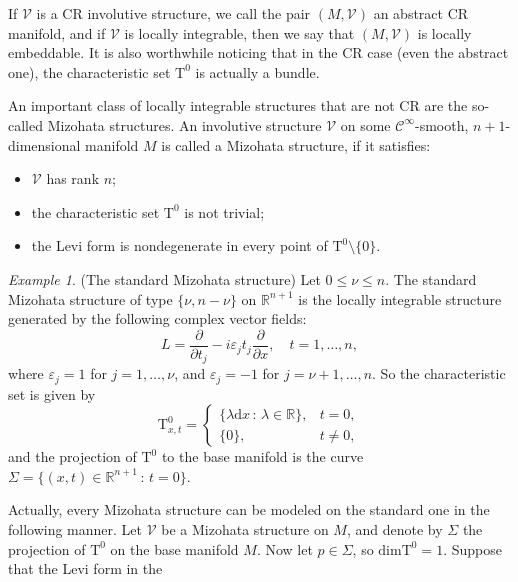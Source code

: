\documentclass[11pt]{amsart}
\renewcommand{\epsilon}{\varepsilon}
\theoremstyle{definition}
\theoremstyle{remark}
\newtheorem{exa}[defn]{Example}
\theoremstyle{plain}
\begin{document}
%
If $\mathcal{V}$ is a CR involutive structure, we call the pair
$(M, \mathcal{V})$ an abstract CR manifold, and if $\mathcal{V}$
is locally integrable, then we say that $(M, \mathcal{V})$ is
locally embeddable. It
is also worthwhile noticing that in the CR case (even the abstract
one), the characteristic set $\mathrm{T}^0$ is actually a bundle.

An important class of locally integrable structures that are not CR
are the so-called Mizohata structures. An involutive structure
$\mathcal{V}$ on some $\mathcal{C}^\infty$-smooth, $n+1$-dimensional
manifold $M$ is called a Mizohata structure, if it satisfies:
%
\begin{itemize}
\item $\mathcal{V}$ has rank $n$;
\item the characteristic set $\mathrm{T}^0$ is not trivial;
\item the Levi form is nondegenerate in every point of
  $\mathrm{T}^0\setminus \{0\}$.
\end{itemize}
%
\begin{exa}
  (The standard Mizohata structure) Let $0 \leq \nu \leq n$. The
  standard Mizohata structure of type $\{\nu, n- \nu\}$ on
  $\mathbb{R}^{n+1}$ is the locally integrable structure generated by
  the following complex vector fields:
%
  \begin{equation*}
    L = \frac{\partial}{\partial t_j} - i\epsilon_jt_j\frac{\partial}{\partial x}, \quad t = 1, \dots, n,
  \end{equation*}
%
  where $\epsilon_j = 1$ for $j = 1, \dots, \nu$, and
  $\epsilon_j = -1$ for $j = \nu + 1, \dots, n$. So the characteristic
  set is given by
%
  \begin{equation*}
    \mathrm{T}^0_{x,t} = 
    \begin{cases}
      \{\lambda \mathrm{d}x \, : \, \lambda \in \mathbb{R} \}, &  t = 0,\\
      \{0\}, & t \neq 0,
    \end{cases}
  \end{equation*}
%
  and the projection of $\mathrm{T}^0$ to the base manifold is the
  curve $\Sigma = \{(x,t) \in \mathbb{R}^{n+1} \, : \, t = 0\}$.
\end{exa}
%
Actually, every Mizohata structure can be modeled on the standard one
in the following manner. Let $\mathcal{V}$ be a Mizohata structure on
$M$, and denote by $\Sigma$ the projection of $\mathrm{T}^0$ on
the base manifold $M$. Now let $p \in \Sigma$, so
$\text{dim}\mathrm{T}^0 = 1$. Suppose that the Levi form in the
\end{document}
